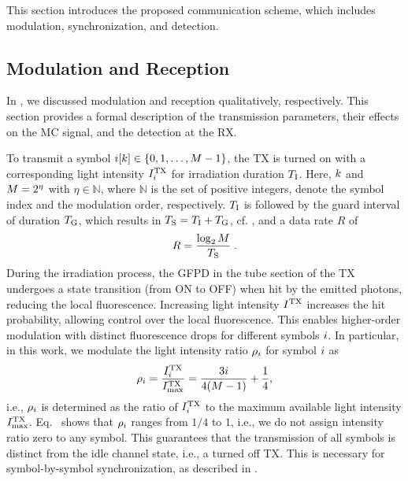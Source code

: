 This section introduces the proposed communication scheme, which includes modulation, synchronization, and detection.
%
\scaleSubsection
\subsection{Modulation and Reception}\label{Sec:Modulation}
\scaleSubsectionBelow
%
In , we discussed modulation and reception qualitatively, respectively. This section provides a formal description of the transmission parameters, their effects on the \ac{MC} signal, and the detection at the \ac{RX}.

To transmit a symbol $i[k] \in \{0, 1, \ldots, M - 1\}$, the \ac{TX} is turned on with a corresponding light intensity $I^{\mathrm{TX}}_i$ for irradiation duration $T_{\mathrm{I}}$. Here, $k$ and $M = 2^\eta$ with $\eta \in \mathbb{N}$, where $\mathbb{N}$ is the set of positive integers, denote the symbol index and the modulation order, respectively. $T_{\mathrm{I}}$ is followed by the guard interval of duration $T_{\mathrm{G}}$, which results in $T_{\mathrm{S}} = T_{\mathrm{I}} + T_{\mathrm{G}}$, cf. , and a data rate $R$ of
\begin{equation}
    R = \frac{\log_2 M}{T_{\mathrm{S}}} \;.
\end{equation}
During the irradiation process, the \ac{GFPD} in the tube section of the \ac{TX} undergoes a state transition (from ON to OFF) when hit by the emitted photons, reducing the local fluorescence. Increasing light intensity $I^{\mathrm{TX}}$ increases the hit probability, allowing control over the local fluorescence. This enables higher-order modulation with distinct fluorescence drops for different symbols $i$. 
%
In particular, in this work, we modulate the light intensity ratio $\rho_i$ for symbol $i$ as
\begin{equation}\label{eq:power_ratio}
    \rho_i = \frac{I^{\mathrm{TX}}_i}{I^{\mathrm{TX}}_{\mathrm{max}}} = \frac{3 i}{4(M-1)} + \frac{1}{4},
\end{equation}
i.e., $\rho_i$ is determined as the ratio of $I^{\mathrm{TX}}_i$ to the maximum available light intensity $I^{\mathrm{TX}}_{\mathrm{max}}$. Eq.~ shows that $\rho_i$ ranges from $1/4$ to $1$, i.e., we do not assign intensity ratio zero to any symbol. This guarantees that the transmission of all symbols is distinct from the idle channel state, i.e., a turned off \ac{TX}. This is necessary for symbol-by-symbol synchronization, as described in .
